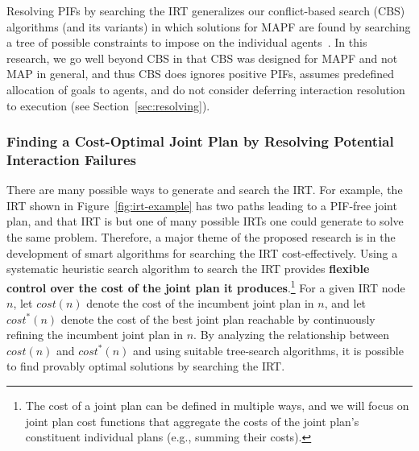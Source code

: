 \documentclass[11pt]{article}
\begin{document}
Resolving PIFs by searching the IRT generalizes our conflict-based search (CBS) algorithms (and its variants) in which solutions for MAPF are found by searching a tree of possible constraints to impose on the individual agents~\cite{sharon2015conflict-based,boyarski2015don,boyarski2015icbs}. In this research, we go well beyond CBS in that CBS was designed for MAPF and not MAP in general, and thus CBS does ignores positive PIFs, assumes predefined allocation of goals to agents, and do not consider deferring interaction resolution to execution (see Section~\ref{sec:resolving}). 

 







\subsubsection{Finding a Cost-Optimal Joint Plan by Resolving Potential Interaction Failures}%

There are many possible ways to generate and search the IRT. For example, the IRT shown in Figure~\ref{fig:irt-example} has two paths leading to a PIF-free joint plan, and that IRT is but one of many possible IRTs one could generate to solve the same problem. Therefore, a major theme of the proposed research is in the development of smart algorithms for searching the IRT cost-effectively. %
Using a systematic heuristic search algorithm to search the IRT provides {\bf flexible control over the cost of the joint plan it produces}.\footnote{The cost of a joint plan can be defined in multiple ways, and we will focus on joint plan cost functions that aggregate the costs of the joint plan's constituent individual plans (e.g., summing their costs).} 
For a given IRT node $n$, let $cost(n)$ denote the cost of the incumbent joint plan in $n$, and let $cost^*(n)$ denote the cost of the best joint plan reachable by continuously refining the incumbent joint plan in $n$.
By analyzing the relationship between $cost(n)$ and $cost^*(n)$ and using suitable tree-search algorithms, it is possible to find provably optimal solutions by searching the IRT. 
\end{document}
